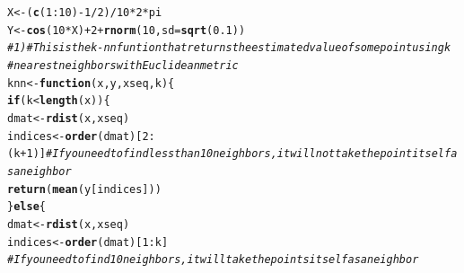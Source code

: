 \documentclass{article}\usepackage[]{graphicx}\usepackage[]{color}
\makeatletter
\newcommand{\hlnum}[1]{\textcolor[rgb]{0.686,0.059,0.569}{#1}}%
\newcommand{\hlcom}[1]{\textcolor[rgb]{0.678,0.584,0.686}{\textit{#1}}}%
\newcommand{\hlopt}[1]{\textcolor[rgb]{0,0,0}{#1}}%
\newcommand{\hlstd}[1]{\textcolor[rgb]{0.345,0.345,0.345}{#1}}%
\newcommand{\hlkwa}[1]{\textcolor[rgb]{0.161,0.373,0.58}{\textbf{#1}}}%
\newcommand{\hlkwb}[1]{\textcolor[rgb]{0.69,0.353,0.396}{#1}}%
\newcommand{\hlkwc}[1]{\textcolor[rgb]{0.333,0.667,0.333}{#1}}%
\newcommand{\hlkwd}[1]{\textcolor[rgb]{0.737,0.353,0.396}{\textbf{#1}}}%
\newenvironment{kframe}{%
 \def\at@end@of@kframe{}%
 \ifinner\ifhmode%
  \def\at@end@of@kframe{\end{minipage}}%
  \begin{minipage}{\columnwidth}%
 \fi\fi%
 \def\FrameCommand##1{\hskip\@totalleftmargin \hskip-\fboxsep
 \colorbox{shadecolor}{##1}\hskip-\fboxsep
     \hskip-\linewidth \hskip-\@totalleftmargin \hskip\columnwidth}%
 \MakeFramed {\advance\hsize-\width
   \@totalleftmargin\z@ \linewidth\hsize
   \@setminipage}}%
 {\par\unskip\endMakeFramed%
 \at@end@of@kframe}
\newenvironment{knitrout}{}{} %
\makeatother
\begin{document}
\begin{knitrout}
\begin{kframe}
{\ttfamily\noindent\itshape\color{messagecolor}{\#\# Loading required package: fields\\\#\# Loading required package: spam\\\#\# Loading required package: grid\\\#\# Spam version 0.40-0 (2013-09-11) is loaded.\\\#\# Type 'help( Spam)' or 'demo( spam)' for a short introduction \\\#\# and overview of this package.\\\#\# Help for individual functions is also obtained by adding the\\\#\# suffix '.spam' to the function name, e.g. 'help( chol.spam)'.\\\#\# \\\#\# Attaching package: 'spam'\\\#\# \\\#\# 下列对象被屏蔽了from 'package:base':\\\#\# \\\#\#\ \ \ \  backsolve, forwardsolve\\\#\# \\\#\# Loading required package: maps}}\begin{alltt}
\hlstd{X} \hlkwb{<-} \hlstd{(}\hlkwd{c}\hlstd{(}\hlnum{1}\hlopt{:}\hlnum{10}\hlstd{)} \hlopt{-} \hlnum{1}\hlopt{/}\hlnum{2}\hlstd{)}\hlopt{/}\hlnum{10} \hlopt{*} \hlnum{2} \hlopt{*} \hlstd{pi}
\hlstd{Y} \hlkwb{<-} \hlkwd{cos}\hlstd{(}\hlnum{10} \hlopt{*} \hlstd{X)} \hlopt{+} \hlnum{2} \hlopt{+} \hlkwd{rnorm}\hlstd{(}\hlnum{10}\hlstd{,} \hlkwc{sd} \hlstd{=} \hlkwd{sqrt}\hlstd{(}\hlnum{0.1}\hlstd{))}
\hlcom{# 1) # This is the k-nn funtion that returns the estimated value of some point using k}
\hlcom{# nearest neighbors with Euclidean metric}
\hlstd{knn} \hlkwb{<-} \hlkwa{function}\hlstd{(}\hlkwc{x}\hlstd{,} \hlkwc{y}\hlstd{,} \hlkwc{xseq}\hlstd{,} \hlkwc{k}\hlstd{) \{}
    \hlkwa{if} \hlstd{(k} \hlopt{<} \hlkwd{length}\hlstd{(x)) \{}
        \hlstd{dmat} \hlkwb{<-} \hlkwd{rdist}\hlstd{(x, xseq)}
        \hlstd{indices} \hlkwb{<-} \hlkwd{order}\hlstd{(dmat)[}\hlnum{2}\hlopt{:}\hlstd{(k} \hlopt{+} \hlnum{1}\hlstd{)]}  \hlcom{# If you need to find less than 10 neighbors, it will not take the point itself as a neighbor}
        \hlkwd{return}\hlstd{(}\hlkwd{mean}\hlstd{(y[indices]))}
    \hlstd{\}} \hlkwa{else} \hlstd{\{}
        \hlstd{dmat} \hlkwb{<-} \hlkwd{rdist}\hlstd{(x, xseq)}
        \hlstd{indices} \hlkwb{<-} \hlkwd{order}\hlstd{(dmat)[}\hlnum{1}\hlopt{:}\hlstd{k]}
        \hlcom{# If you need to find 10 neighbors, it will take the points itself as a neighbor}

\end{alltt}
\end{kframe}
\end{knitrout}
\end{document}
